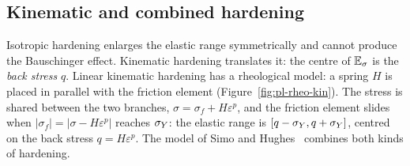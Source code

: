 \subsection{Kinematic and combined hardening}\label{ssec:pl-1d-kin}
%
Isotropic hardening enlarges the elastic range symmetrically and cannot
produce the Bauschinger effect. Kinematic hardening translates it: the centre
of $\mathbb{E}_{\sigma}$ is the \emph{back stress} $q$. Linear kinematic hardening has a
rheological model: a spring $H$ is placed in parallel with the friction
element (Figure~\ref{fig:pl-rheo-kin}). The stress is shared between the two
branches, $\sigma=\sigma_f+H\varepsilon^p$, and the friction element slides
when $|\sigma_f|=|\sigma-H\varepsilon^p|$ reaches $\sigma_{Y}$: the elastic range is
$[q-\sigma_{Y},q+\sigma_{Y}]$, centred on the back stress $q=H\varepsilon^p$. The model of
Simo and Hughes~\cite[Sec.~1.3]{SimoHughes1998} combines both kinds of
hardening.

